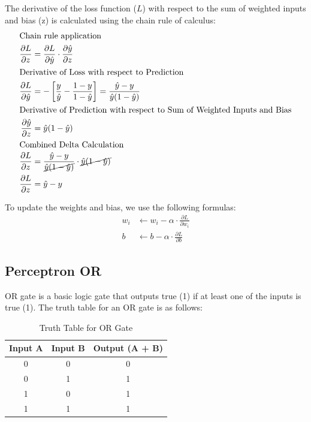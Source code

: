 \documentclass[a4paper,10pt]{article}
\begin{document}
The derivative of the loss function ($L$) with respect to the sum of weighted inputs and bias (z) is calculated using the chain rule of calculus:
\begin{align}\label{eq:chain_rule}
\intertext{Chain rule application}
    \frac{\partial L}{\partial z} &= \frac{\partial L}{\partial \hat{y}} \cdot \frac{\partial \hat{y}}{\partial z} \\
\intertext{Derivative of Loss with respect to Prediction}
    \frac{\partial L}{\partial \hat{y}} &= -\left[ \frac{y}{\hat{y}} - \frac{1-y}{1-\hat{y}} \right] = \frac{\hat{y} - y}{\hat{y}(1-\hat{y})} \\
\intertext{Derivative of Prediction with respect to Sum of Weighted Inputs and Bias}
    \frac{\partial \hat{y}}{\partial z} &= \hat{y}(1 - \hat{y}) \\
\intertext{Combined Delta Calculation}
    \frac{\partial L}{\partial z} &= \frac{\hat{y} - y}{\cancel{\hat{y}(1-\hat{y})}} \cdot \cancel{\hat{y}(1 - \hat{y})} \nonumber \\
    \frac{\partial L}{\partial z} &= \hat{y} - y
\end{align}

To update the weights and bias, we use the following formulas:
\begin{align}\label{eq:update_weights_bias}
    w_i &\leftarrow w_i - \alpha \cdot \frac{\partial L}{\partial w_i} \\
    b &\leftarrow b - \alpha \cdot \frac{\partial L}{\partial b}
\end{align}

\subsection{Perceptron OR}

OR gate is a basic logic gate that outputs true (1) if at least one of the inputs is true (1). The truth table for an OR gate is as follows:
\begin{table}[h]\label{tab:or_gate}
    \centering
    \caption{Truth Table for OR Gate}
    \begin{tabular}{c c c}
        \toprule
        \textbf{Input A} & \textbf{Input B} & \textbf{Output (A + B)} \\
        \midrule
        0 & 0 & 0 \\
        0 & 1 & 1 \\
        1 & 0 & 1 \\
        1 & 1 & 1 \\
        \bottomrule
    \end{tabular}
\end{table}
\end{document}
